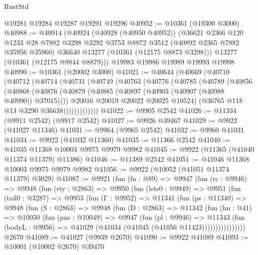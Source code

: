 \begin{lexlean}{RustStd}
\begin{coremodule}
    @19281
    @19284
    @19287
    @19291
    @19296
@40952 := @10361 (@19300 @3000)
@40988 := @40914
    (@40924
      (@40928 (@40950 @40952))
      (@36621
        @2366
        @120
        @1233
        @28
        @7882
        @3298
        @3292
        @3753
        @8872
        @3512
        (@40892 @2365 @7882 @35956 @35960)
        @36640
        @13277
        (@10361 (@12175 @8873 @3298)))
      @13277
      (@10361 (@12175 @8844 @8879)))
    @19983
    @19986
    @19989
    @19993
    @19998
@40990 := @10361 (@20002 @3000)
@41021 := @40644
    (@40669
      (@40710
        (@40712
          (@40714
            (@40731
              (@40749
                (@40763
                  (@40776
                    (@40785
                      (@40789
                        (@40856
                          (@40868
                            (@40876
                              (@40879 (@40885 (@40897 (@40903 (@40907 (@40988 @40990)) @37015))))
                              @20016
                              @20019
                              @20022
                              @20025
                              @10524)
                            (@36765 @118 @13 @3290 @36638)))))))))))))
@41022 := @9905 @2542
@41026 := @11334 (@9911 @2542) (@9917 @2542)
@41027 := @9926 @39467
@41029 := @9922 (@41027 @11346)
@41031 := @9964 (@9965 @2542)
@41032 := @9960 @41031
@41034 := @9922 (@41032 @11360)
@41035 := @11366 @2542
@41040 := @41035 @11368 @10003 @9975 @9979 @9982
@41045 := @9922 (@11365 (@41040 @11374 @11379) @11386)
@41046 := @11389 @2542
@41051 := @41046 @11368 @10003 @9975 @9979 @9982
@41056 := @9922 (@10052 (@41051 @11374 @11379) @3029)
@41087 := @9921
    (fun (fn : @89) =>
    @9947
      (fun (rc : @9946) =>
      @9948
        (fun (rty : @2863) =>
        @9950
          (fun (lets0 : @9949) =>
          @9951
            (fun (tail0 : @3287) =>
            @9953
              (fun (Γ : @9952) =>
              @11341
                (fun (ps : @11340) =>
                @9948
                  (fun (S : @2863) =>
                  @9948
                    (fun (D : @2863) =>
                    @11342
                      (fun (hn : @41) =>
                      @10050
                        (fun (pns : @10049) =>
                        @9947
                          (fun (pl : @9946) =>
                          @11343
                            (fun (bodyL : @9956) =>
                            @41029 (@41034 (@41045 (@41056 @11423))))))))))))))))
    @2670
@41089 := @41027 (@9939 @2670)
@41090 := @9922 @41089
@41093 := @10001 (@10002 @2670) @39470

\end{coremodule}
\end{lexlean}
